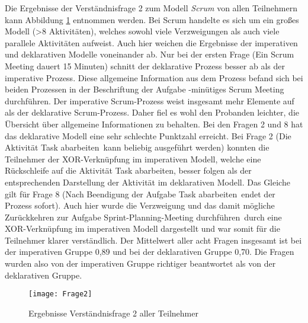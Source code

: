 Die Ergebnisse der Verständnisfrage 2 zum Modell \textit{Scrum} von allen Teilnehmern kann Abbildung \ref{fig:Frage2} entnommen werden.  Bei Scrum handelte es sich um ein großes Modell (>8 Aktivitäten), welches sowohl viele Verzweigungen als auch viele parallele Aktivitäten aufweist. Auch hier weichen die Ergebnisse der imperativen und deklarativen Modelle voneinander ab.\newline
Nur bei der ersten Frage (\grqq Ein Scrum Meeting dauert 15 Minuten\grqq) schnitt der deklarative Prozess besser ab als der imperative Prozess. Diese allgemeine Information aus dem Prozess befand sich bei beiden Prozessen in der Beschriftung der Aufgabe -minütiges Scrum Meeting durchführen\grqq. Der imperative Scrum-Prozess weist insgesamt mehr Elemente auf als der deklarative Scrum-Prozess. Daher fiel es wohl den Probanden leichter, die Übersicht über allgemeine Informationen zu behalten.\newline
Bei den Fragen 2 und 8 hat das deklarative Modell eine sehr schlechte Punktzahl erreicht. Bei Frage 2 (\grqq Die Aktivität \grqq Task abarbeiten\grqq \ kann beliebig ausgeführt werden\grqq) konnten die Teilnehmer der XOR-Verknüpfung im imperativen Modell, welche eine Rückschleife auf die Aktivität \grqq Task abarbeiten\grqq, besser folgen als der entsprechenden Darstellung der Aktivität im deklarativen Modell. \newline
Das Gleiche gilt für Frage 8 (\grqq Nach Beendigung der Aufgabe \grqq Task abarbeiten\grqq \ endet der Prozess sofort\grqq). Auch hier wurde die Verzweigung und das damit mögliche Zurückkehren zur Aufgabe \grqq Sprint-Planning-Meeting durchführen\grqq \ durch eine XOR-Verknüpfung im imperativen Modell dargestellt und war somit für die Teilnehmer klarer verständlich.\newline
Der Mittelwert aller acht Fragen insgesamt ist bei der imperativen Gruppe 0,89 und bei der deklarativen Gruppe 0,70. Die Fragen wurden also von der imperativen Gruppe richtiger beantwortet als von der deklarativen Gruppe.\newline


\begin{figure}[htp]
\begin{center}
  \texttt{[image: Frage2]} %
  \caption{Ergebnisse Verständnisfrage 2 aller Teilnehmer}
  \label{fig:Frage2}
\end{center}
\end{figure}

